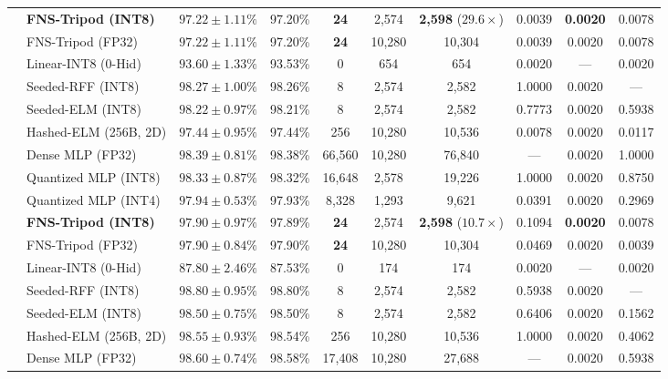 \begin{table}[t]
{\begin{tabular}{@{}llcccccccc@{}}
 & \textbf{FNS-Tripod (INT8)} & $97.22 \pm 1.11\%$ & 97.20\% & \textbf{24} & 2,574 & \textbf{2,598} ($29.6\times$) & 0.0039 & \textbf{0.0020} & 0.0078 \\
 & FNS-Tripod (FP32) & $97.22 \pm 1.11\%$ & 97.20\% & \textbf{24} & 10,280 & 10,304 & 0.0039 & 0.0020 & 0.0078 \\
 & Linear-INT8 (0-Hid) & $93.60 \pm 1.33\%$ & 93.53\% & 0 & 654 & 654 & 0.0020 & --- & 0.0020 \\
 & Seeded-RFF (INT8) & $98.27 \pm 1.00\%$ & 98.26\% & 8 & 2,574 & 2,582 & 1.0000 & 0.0020 & --- \\
 & Seeded-ELM (INT8) & $98.22 \pm 0.97\%$ & 98.21\% & 8 & 2,574 & 2,582 & 0.7773 & 0.0020 & 0.5938 \\
 & Hashed-ELM (256B, 2D) & $97.44 \pm 0.95\%$ & 97.44\% & 256 & 10,280 & 10,536 & 0.0078 & 0.0020 & 0.0117 \\
 & Dense MLP (FP32) & $98.39 \pm 0.81\%$ & 98.38\% & 66,560 & 10,280 & 76,840 & --- & 0.0020 & 1.0000 \\
 & Quantized MLP (INT8) & $98.33 \pm 0.87\%$ & 98.32\% & 16,648 & 2,578 & 19,226 & 1.0000 & 0.0020 & 0.8750 \\
 & Quantized MLP (INT4) & $97.94 \pm 0.53\%$ & 97.93\% & 8,328 & 1,293 & 9,621 & 0.0391 & 0.0020 & 0.2969 \\
\midrule
{}
 & \textbf{FNS-Tripod (INT8)} & $97.90 \pm 0.97\%$ & 97.89\% & \textbf{24} & 2,574 & \textbf{2,598} ($10.7\times$) & 0.1094 & \textbf{0.0020} & 0.0078 \\
 & FNS-Tripod (FP32) & $97.90 \pm 0.84\%$ & 97.90\% & \textbf{24} & 10,280 & 10,304 & 0.0469 & 0.0020 & 0.0039 \\
 & Linear-INT8 (0-Hid) & $87.80 \pm 2.46\%$ & 87.53\% & 0 & 174 & 174 & 0.0020 & --- & 0.0020 \\
 & Seeded-RFF (INT8) & $98.80 \pm 0.95\%$ & 98.80\% & 8 & 2,574 & 2,582 & 0.5938 & 0.0020 & --- \\
 & Seeded-ELM (INT8) & $98.50 \pm 0.75\%$ & 98.50\% & 8 & 2,574 & 2,582 & 0.6406 & 0.0020 & 0.1562 \\
 & Hashed-ELM (256B, 2D) & $98.55 \pm 0.93\%$ & 98.54\% & 256 & 10,280 & 10,536 & 1.0000 & 0.0020 & 0.4062 \\
 & Dense MLP (FP32) & $98.60 \pm 0.74\%$ & 98.58\% & 17,408 & 10,280 & 27,688 & --- & 0.0020 & 0.5938 \\

\end{tabular}}
\end{table}
